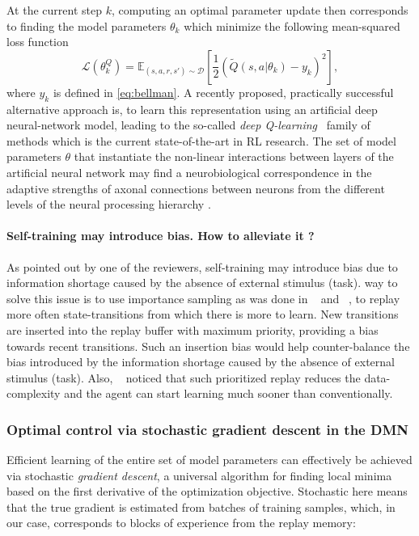 \documentclass[10pt,letterpaper]{article}
\begin{document}
At the current step $k$, computing an optimal parameter update then corresponds to
finding the model parameters $\theta_{k}$ which minimize the following mean-squared loss function
\begin{equation}
  \mathcal L(\theta^Q_{k})
  = \mathbb E_{(s, a, r, s') \sim \mathcal D}\left[\frac{1}{2}(\tilde{Q}(s, a|\theta_{k}) - y_k)^2\right],
  \label{eq:oracle}
\end{equation}
where $y_k$ is defined in \eqref{eq:bellman}.
A recently proposed, practically successful alternative approach is, to learn this
representation using an artificial deep neural-network model, leading to the
so-called \textit{deep Q-learning}~\citep{mnih2015,silver2016mastering} family of methods which
is the current state-of-the-art in RL research.
The set of model parameters $\theta$ that instantiate the non-linear interactions
between layers of the artificial neural network
may find a neurobiological correspondence in the adaptive strengths of axonal
connections between neurons from the different levels
of the neural processing hierarchy
\citep{mesulam1998sensation, taylor2015global}.

\paragraph*{Self-training may introduce bias. How to alleviate it ?}
As pointed out by one of the reviewers, self-training may introduce bias due to information shortage caused by the absence of external stimulus (task).
 way to solve this issue is to use importance sampling as was done in ~\citep{schaul2015} and ~\citep{hessel2017}, to replay more often state-transitions from which there is more to learn. New transitions are inserted into the replay buffer with maximum priority, providing a bias towards recent transitions. Such an insertion bias would help counter-balance the bias introduced by the information shortage caused by the absence of external stimulus (task). Also, ~\citep{hessel2017} noticed that such prioritized replay reduces the data-complexity and the agent can start learning much sooner than conventionally.


\subsubsection{Optimal control via stochastic gradient descent in the DMN}
Efficient learning of the entire set of model parameters can effectively be achieved
via stochastic \textit{gradient descent}, a universal algorithm for finding
local minima based on the first derivative of the optimization objective.
Stochastic here means that the true gradient is estimated from batches of training samples,
which, in our case, corresponds to blocks of experience from the replay memory:
\end{document}
